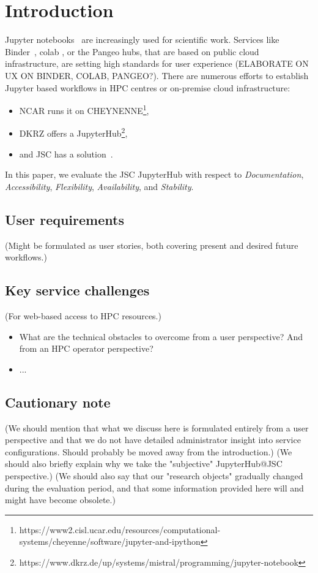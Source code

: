 
\section{Introduction}
\label{s-introductoin}

Jupyter notebooks~\citep{Kluyver2016} are increasingly used for scientific work.
Services like Binder~\citep{Jupyter2018}, colab \citep{Google2020, Carneiro2018}, or the Pangeo hubs\citep{robinson2019science}, that are based on public cloud infrastructure, are setting high standards for user experience (ELABORATE ON UX ON BINDER, COLAB, PANGEO?).
There are numerous efforts to establish Jupyter based workflows in HPC centres or on-premise cloud infrastructure:
\begin{itemize}
  \item NCAR runs it on CHEYNENNE\footnote{https://www2.cisl.ucar.edu/resources/computational-systems/cheyenne/software/jupyter-and-ipython},
  \item DKRZ offers a JupyterHub\footnote{https://www.dkrz.de/up/systems/mistral/programming/jupyter-notebook},
  \item and JSC has a solution~\citep{Goebbert2018}.
\end{itemize}

In this paper, we evaluate the JSC JupyterHub with respect to {\em Documentation}, {\em Accessibility}, {\em Flexibility}, {\em Availability}, and {\em Stability}.

\subsection{User requirements}

(Might be formulated as user stories, both covering present and desired future workflows.)

\subsection{Key service challenges}

(For web-based access to HPC resources.)

\begin{itemize}
  \item What are the technical obstacles to overcome from a user perspective? And from an HPC operator perspective?
  \item ...
\end{itemize}

\subsection{Cautionary note}

(We should mention that what we discuss here is formulated entirely from a user perspective and that we do not have detailed administrator insight into service configurations. Should probably be moved away from the introduction.) (We should also briefly explain why we take the "subjective" JupyterHub@JSC perspective.)
(We should also say that our "research objects" gradually changed during the evaluation period, and that some information provided here will and might have become obsolete.)
